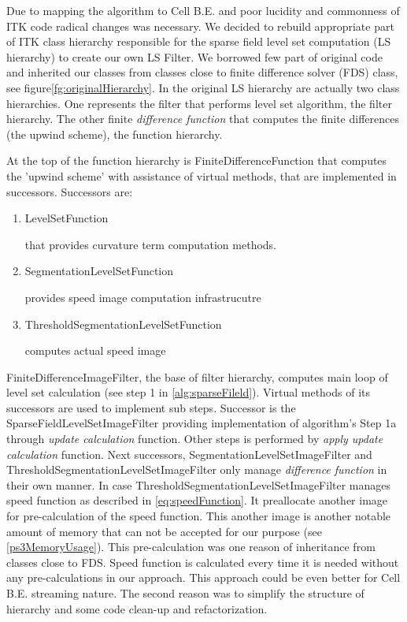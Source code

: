 \par
Due to mapping the algorithm to Cell B.E. and poor lucidity and commonness of ITK code radical changes was necessary.
We decided to rebuild appropriate part of ITK class hierarchy responsible for the sparse field level set computation (LS hierarchy) to create our own LS Filter.
We borrowed few part of original code and inherited our classes from classes close to finite difference solver (FDS) class, see figure\ref{fg:originalHierarchy}.
In the original LS hierarchy are actually two class hierarchies.
One represents the filter that performs level set algorithm, the filter hierarchy.
The other finite \emph{difference function} that computes the finite differences (the upwind scheme), the function hierarchy.

At the top of the function hierarchy is FiniteDifferenceFunction that computes the 'upwind scheme' with assistance of virtual methods, that are implemented in successors.
Successors are:
\begin{enumerate}
  \item{LevelSetFunction}
  \par
  that provides curvature term computation methods.

\item{SegmentationLevelSetFunction}
\par
provides speed image computation infrastrucutre

\item{ThresholdSegmentationLevelSetFunction}
\par
computes actual speed image
\end{enumerate}

FiniteDifferenceImageFilter, the base of filter hierarchy, computes main loop of level set calculation (see step 1 in \ref{alg:sparseFileld}).
Virtual methods of its successors are used to implement sub steps.
Successor is the SparseFieldLevelSetImageFilter providing implementation of algorithm's Step 1a through \emph{update calculation} function.
Other steps is performed by \emph{apply update calculation} function.
Next successors, SegmentationLevelSetImageFilter and ThresholdSegmentationLevelSetImageFilter only manage \emph{difference function} in their own manner.
In case ThresholdSegmentationLevelSetImageFilter manages speed function as described in \ref{eq:speedFunction}.
It preallocate another image for pre-calculation of the speed function.
This another image is another notable amount of memory that can not be accepted for our purpose (see \ref{ps3MemoryUsage}).
This pre-calculation was one reason of inheritance from classes close to FDS.
Speed function is calculated every time it is needed without any pre-calculations in our approach.
This approach could be even better for Cell B.E. streaming nature.
The second reason was to simplify the structure of hierarchy and some code clean-up and refactorization.

